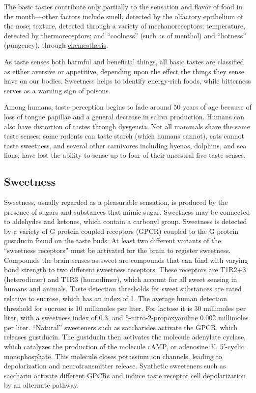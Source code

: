 The basic tastes contribute only partially to the sensation and flavor of food in the mouth---other factors include smell, detected by the olfactory epithelium of the nose; texture, detected through a variety of mechanoreceptors; temperature, detected by thermoreceptors; and ``coolness'' (such as of menthol) and ``hotness'' (pungency), through \href{https://en.wikipedia.org/wiki/Chemesthesis}{chemesthesis}.

As taste senses both harmful and beneficial things, all basic tastes are classified as either aversive or appetitive, depending upon the effect the things they sense have on our bodies. Sweetness helps to identify energy-rich foods, while bitterness serves as a warning sign of poisons.

Among humans, taste perception begins to fade around 50 years of age because of loss of tongue papillae and a general decrease in saliva production. Humans can also have distortion of tastes through dysgeusia. Not all mammals share the same taste senses: some rodents can taste starch (which humans cannot), cats cannot taste sweetness, and several other carnivores including hyenas, dolphins, and sea lions, have lost the ability to sense up to four of their ancestral five taste senses.

\hypertarget{sweetness}{%
\subsection{Sweetness}\label{sweetness}}

Sweetness, usually regarded as a pleasurable sensation, is produced by the presence of sugars and substances that mimic sugar. Sweetness may be connected to aldehydes and ketones, which contain a carbonyl group. Sweetness is detected by a variety of G protein coupled receptors (GPCR) coupled to the G protein gustducin found on the taste buds. At least two different variants of the ``sweetness receptors'' must be activated for the brain to register sweetness. Compounds the brain senses as sweet are compounds that can bind with varying bond strength to two different sweetness receptors. These receptors are T1R2+3 (heterodimer) and T1R3 (homodimer), which account for all sweet sensing in humans and animals. Taste detection thresholds for sweet substances are rated relative to sucrose, which has an index of 1. The average human detection threshold for sucrose is 10 millimoles per liter. For lactose it is 30 millimoles per liter, with a sweetness index of 0.3, and 5-nitro-2-propoxyaniline 0.002 millimoles per liter. ``Natural'' sweeteners such as saccharides activate the GPCR, which releases gustducin. The gustducin then activates the molecule adenylate cyclase, which catalyzes the production of the molecule cAMP, or adenosine 3', 5'-cyclic monophosphate. This molecule closes potassium ion channels, leading to depolarization and neurotransmitter release. Synthetic sweeteners such as saccharin activate different GPCRs and induce taste receptor cell depolarization by an alternate pathway.


